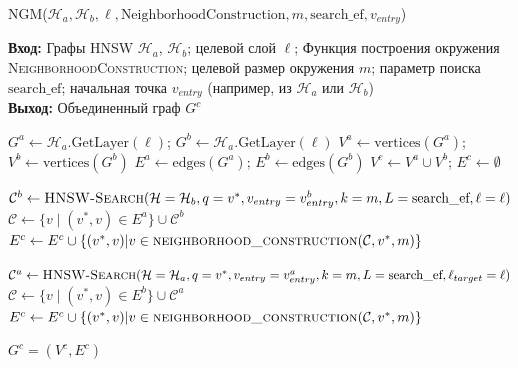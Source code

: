 \documentclass{article}
\begin{document}
\begin{algorithm}
\caption{\textsc{NGM}($\mathcal{H}_a, \mathcal{H}_b, \ell, \text{NeighborhoodConstruction}, m, \text{search\_ef}, v_{entry}$)}\label{alg:merge_naive}
\textbf{Вход:} Графы HNSW $\mathcal{H}_a$, $\mathcal{H}_b$; целевой слой $\ell$; Функция построения окружения \textsc{NeighborhoodConstruction}; целевой размер окружения $m$; параметр поиска $\text{search\_ef}$; начальная точка $v_{entry}$ (например, из $\mathcal{H}_a$ или $\mathcal{H}_b$) \\
\textbf{Выход:} Объединенный граф $G^c$
\begin{algorithmic}[1]
\State $G^a \gets \mathcal{H}_a\text{.GetLayer}(\ell) $; $G^b \gets\mathcal{H}_a\text{.GetLayer}(\ell)$ 
\State $V^a \gets \text{vertices}(G^a)$; $V^b \gets \text{vertices}(G^b)$
\State $E^a \gets \text{edges}(G^a)$; $E^b \gets \text{edges}(G^b)$
\State $V^c \gets V^a \cup V^b$; $E^c \gets \emptyset$ 

    \State $\mathcal{C}^b \gets \textsc{HNSW-Search}(\mathcal{H}=\mathcal{H}_b, q=v^*, v_{entry}=v_{entry}^b, k=m, L=\text{search\_ef}, \ell=\ell)$ 
    \State $\mathcal{C} \gets \{v \mid (v^*, v) \in E^a \} \cup \mathcal{C}^b$  
    \State $E^c \gets E^c \cup \{(v^*, v) | v \in \textsc{neighborhood\_construction}(\mathcal{C}, v^*, m)\}$
\EndFor

    \State $\mathcal{C}^a \gets \textsc{HNSW-Search}(\mathcal{H}=\mathcal{H}_a, q=v^*, v_{entry}=v_{entry}^a, k=m, L=\text{search\_ef}, \ell_{target}=\ell)$ 
    \State $\mathcal{C} \gets \{v \mid (v^*, v) \in E^b \} \cup \mathcal{C}^a$  
    \State $E^c \gets E^c \cup \{(v^*, v) | v \in \textsc{neighborhood\_construction}(\mathcal{C}, v^*, m)\}$
\EndFor

\State \Return $G^c = (V^c, E^c)$
\end{algorithmic}
\end{algorithm}
\end{document}
